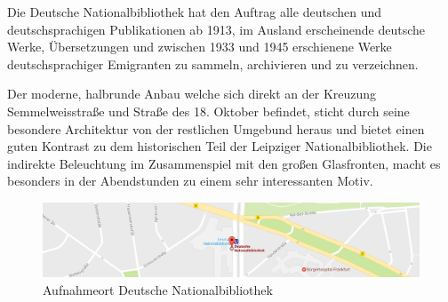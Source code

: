 \documentclass[liststotoc,bibtotoc,fontsize=14pt,]{scrreprt}
\begin{document}
\bigskip
Die Deutsche Nationalbibliothek hat den Auftrag alle deutschen und deutschsprachigen Publikationen ab 1913, im Ausland erscheinende deutsche Werke, Übersetzungen und zwischen 1933 und 1945 erschienene Werke deutschsprachiger Emigranten zu sammeln, archivieren und zu verzeichnen. 

\bigskip
Der moderne, halbrunde Anbau welche sich direkt an der Kreuzung Semmelweisstraße und Straße des 18. Oktober befindet, sticht durch seine besondere Architektur von der restlichen Umgebund heraus und bietet einen guten Kontrast zu dem historischen Teil der Leipziger Nationalbibliothek. Die indirekte Beleuchtung im Zusammenspiel mit den großen Glasfronten, macht es besonders in der Abendstunden zu einem sehr interessanten Motiv. 

\begin{figure}[H]
	\includegraphics[width=\linewidth]{img/places/bibo_map.jpg}
	\caption{Aufnahmeort Deutsche Nationalbibliothek}
	\label{img:ak_map}
\end{figure}
	
\end{document}
